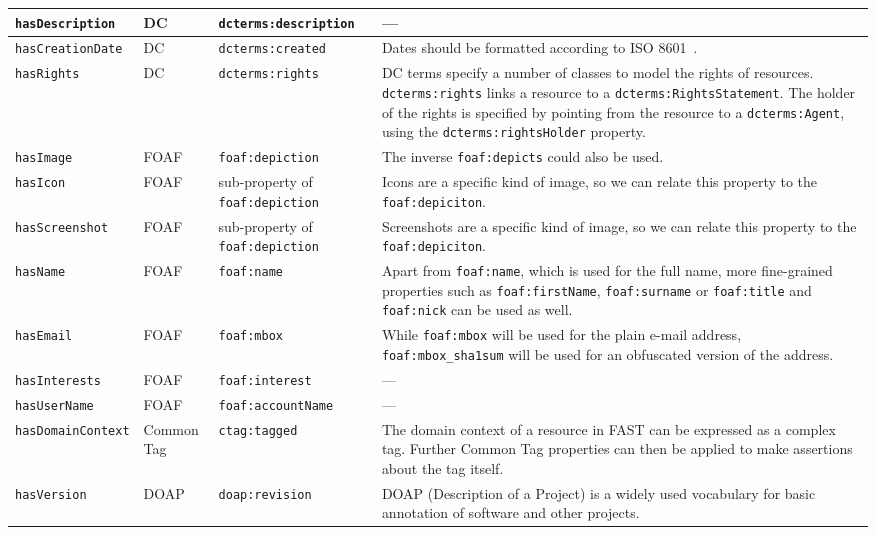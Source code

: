\documentclass[twoside]{fast_latex}
\newcommand{\todo}[1]{\textsf{\textbf{\textcolor{Orange}{[[TODO: #1]]}}}}
\newcommand{\todo}[1]{}
\begin{document}
\begin{small}
\begin{longtable}{|p{3cm}|p{1.5cm}|p{3.5cm}|p{6.1cm}|}
\texttt{hasDescription} & DC & \texttt{dcterms:description} & --- \\ \hline
\texttt{hasCreationDate} & DC & \texttt{dcterms:created} & Dates should be formatted according to ISO 8601~\cite{w3c_iso8601_1997}. \\ \hline
\texttt{hasRights} & DC & \texttt{dcterms:rights} & DC terms specify a number of classes to model the rights of resources. \texttt{dcterms:rights} links a resource to a \texttt{dcterms:RightsStatement}. The holder of the rights is specified by pointing from the resource to a \texttt{dcterms:Agent}, using the \texttt{dcterms:rightsHolder} property. \\ \hline
\texttt{hasImage} & FOAF & \texttt{foaf:depiction} & The inverse \texttt{foaf:depicts} could also be used. \\ \hline
\texttt{hasIcon} & FOAF & sub-property of \texttt{foaf:depiction} & Icons are a specific kind of image, so we can relate this property to the \texttt{foaf:depiciton}. \\ \hline
\texttt{hasScreenshot} & FOAF & sub-property of \texttt{foaf:depiction} & Screenshots are a specific kind of image, so we can relate this property to the \texttt{foaf:depiciton}. \\ \hline
\texttt{hasName} & FOAF & \texttt{foaf:name} & Apart from \texttt{foaf:name}, which is used for the full name, more fine-grained properties such as \texttt{foaf:firstName}, \texttt{foaf:surname} or \texttt{foaf:title} and \texttt{foaf:nick} can be used as well. \\ \hline
\texttt{hasEmail} & FOAF & \texttt{foaf:mbox} & While \texttt{foaf:mbox} will be used for the plain e-mail address, \texttt{foaf:mbox\_sha1sum} will be used for an obfuscated version of the address. \\ \hline
\texttt{hasInterests} & FOAF & \texttt{foaf:interest} & --- \\ \hline
\texttt{hasUserName} & FOAF & \texttt{foaf:accountName} & --- \\ \hline
\texttt{hasDomainContext} & Common Tag & \texttt{ctag:tagged} & The domain context of a resource in FAST can be expressed as a complex tag. Further Common Tag properties can then be applied to make assertions about the tag itself. \\ \hline
\texttt{hasVersion} & DOAP & \texttt{doap:revision} & DOAP (Description of a Project) is a widely used vocabulary for basic annotation of software and other projects. \\ \hline
\end{longtable}
\end{small}
\doublespacing
\end{document}
